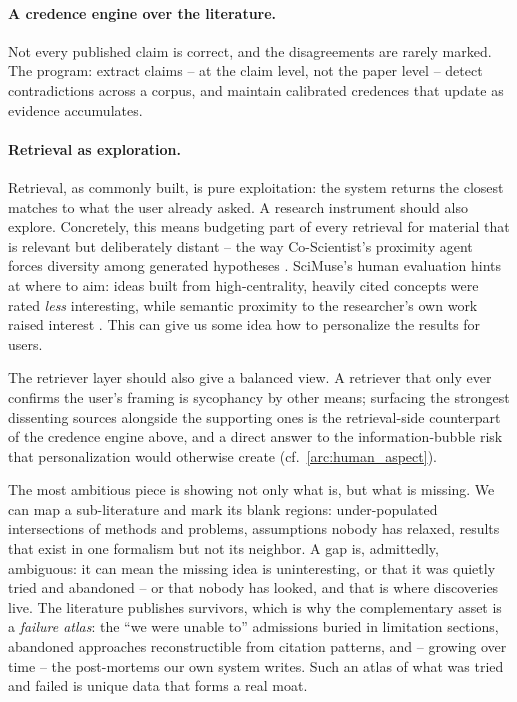 \paragraph{A credence engine over the literature.}
Not every published claim is correct, and the disagreements are rarely marked. The program: extract claims -- at the claim level, not the paper level -- detect contradictions across a corpus, and maintain calibrated credences that update as evidence accumulates.

\paragraph{Retrieval as exploration.}
Retrieval, as commonly built, is pure exploitation: the system returns the closest matches to what the user already asked. A research instrument should also explore. Concretely, this means budgeting part of every retrieval for material that is relevant but deliberately distant -- the way Co-Scientist's proximity agent forces diversity among generated hypotheses \cite{Gottweis2026}. SciMuse's human evaluation hints at where to aim: ideas built from high-centrality, heavily cited concepts were rated \emph{less} interesting, while semantic proximity to the researcher's own work raised interest \cite{2405.17044}. This can give us some idea how to personalize the results for users.

The retriever layer should also give a balanced view. A retriever that only ever confirms the user's framing is sycophancy by other means; surfacing the strongest dissenting sources alongside the supporting ones is the retrieval-side counterpart of the credence engine above, and a direct answer to the information-bubble risk that personalization would otherwise create (cf.\ \ref{arc:human_aspect}).

The most ambitious piece is showing not only what is, but what is missing. We can map a sub-literature and mark its blank regions: under-populated intersections of methods and problems, assumptions nobody has relaxed, results that exist in one formalism but not its neighbor. A gap is, admittedly, ambiguous: it can mean the missing idea is uninteresting, or that it was quietly tried and abandoned -- or that nobody has looked, and that is where discoveries live. The literature publishes survivors, which is why the complementary asset is a \emph{failure atlas}: the ``we were unable to'' admissions buried in limitation sections, abandoned approaches reconstructible from citation patterns, and -- growing over time -- the post-mortems our own system writes. Such an atlas of what was tried and failed is unique data that forms a real moat.

